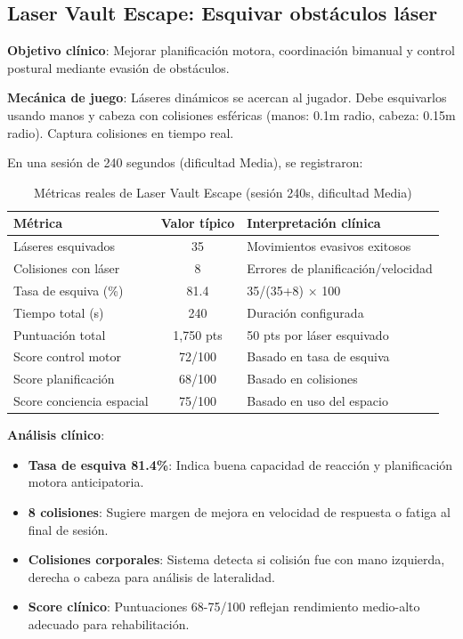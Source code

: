 \subsection{Laser Vault Escape: Esquivar obstáculos láser}

\textbf{Objetivo clínico}: Mejorar planificación motora, coordinación bimanual y control postural mediante evasión de obstáculos.

\textbf{Mecánica de juego}: Láseres dinámicos se acercan al jugador. Debe esquivarlos usando manos y cabeza con colisiones esféricas (manos: 0.1m radio, cabeza: 0.15m radio). Captura colisiones en tiempo real.

En una sesión de 240 segundos (dificultad Media), se registraron:

\begin{table}[h]
\centering
\begin{tabular}{|l|c|l|}
\hline
\textbf{Métrica} & \textbf{Valor típico} & \textbf{Interpretación clínica} \\ \hline
Láseres esquivados & 35 & Movimientos evasivos exitosos \\ \hline
Colisiones con láser & 8 & Errores de planificación/velocidad \\ \hline
Tasa de esquiva (\%) & 81.4 & 35/(35+8) × 100 \\ \hline
Tiempo total (s) & 240 & Duración configurada \\ \hline
Puntuación total & 1,750 pts & 50 pts por láser esquivado \\ \hline
Score control motor & 72/100 & Basado en tasa de esquiva \\ \hline
Score planificación & 68/100 & Basado en colisiones \\ \hline
Score conciencia espacial & 75/100 & Basado en uso del espacio \\ \hline
\end{tabular}
\caption{Métricas reales de Laser Vault Escape (sesión 240s, dificultad Media)}
\label{tab:vault-metrics}
\end{table}

\textbf{Análisis clínico}:
\begin{itemize}
    \item \textbf{Tasa de esquiva 81.4\%}: Indica buena capacidad de reacción y planificación motora anticipatoria.
    \item \textbf{8 colisiones}: Sugiere margen de mejora en velocidad de respuesta o fatiga al final de sesión.
    \item \textbf{Colisiones corporales}: Sistema detecta si colisión fue con mano izquierda, derecha o cabeza para análisis de lateralidad.
    \item \textbf{Score clínico}: Puntuaciones 68-75/100 reflejan rendimiento medio-alto adecuado para rehabilitación.
\end{itemize}


